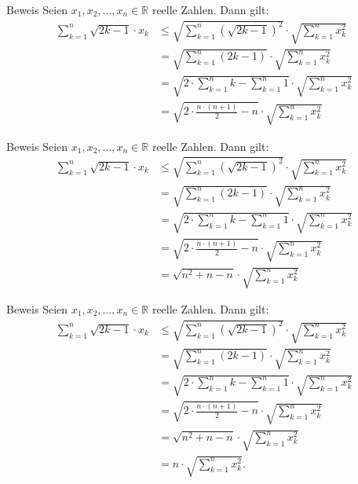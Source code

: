 \documentclass[10pt]{beamer}
\def\bR{\mathbb{R}}
\begin{document}
\begin{frame}{Beweis}
    Seien \( x_{1}, x_{2}, \ldots, x_{n} \in \bR \) reelle Zahlen. Dann gilt:
    \begin{align*}
        \sum_{k = 1}^{n} \sqrt{2k - 1} \cdot x_{k}
        & \leq \sqrt{\sum_{k = 1}^{n} \left( \sqrt{2k - 1} \right)^{2}} \cdot \sqrt{\sum_{k = 1}^{n} x_{k}^{2}} \\
        & = \sqrt{\sum_{k = 1}^{n} \left( 2k - 1 \right)} \cdot \sqrt{\sum_{k = 1}^{n} x_{k}^{2}} \\
        & = \sqrt{2 \cdot \sum_{k = 1}^{n} k - \sum_{k = 1}^{n} 1} \cdot \sqrt{\sum_{k = 1}^{n} x_{k}^{2}} \\
        & = \sqrt{2 \cdot \frac{n \cdot \left( n + 1 \right)}{2} - n} \cdot \sqrt{\sum_{k = 1}^{n} x_{k}^{2}}
    \end{align*}
\end{frame}



\begin{frame}{Beweis}
    Seien \( x_{1}, x_{2}, \ldots, x_{n} \in \bR \) reelle Zahlen. Dann gilt:
    \begin{align*}
        \sum_{k = 1}^{n} \sqrt{2k - 1} \cdot x_{k}
        & \leq \sqrt{\sum_{k = 1}^{n} \left( \sqrt{2k - 1} \right)^{2}} \cdot \sqrt{\sum_{k = 1}^{n} x_{k}^{2}} \\
        & = \sqrt{\sum_{k = 1}^{n} \left( 2k - 1 \right)} \cdot \sqrt{\sum_{k = 1}^{n} x_{k}^{2}} \\
        & = \sqrt{2 \cdot \sum_{k = 1}^{n} k - \sum_{k = 1}^{n} 1} \cdot \sqrt{\sum_{k = 1}^{n} x_{k}^{2}} \\
        & = \sqrt{2 \cdot \frac{n \cdot \left( n + 1 \right)}{2} - n} \cdot \sqrt{\sum_{k = 1}^{n} x_{k}^{2}} \\
        & = \sqrt{n^{2} + n - n} \cdot \sqrt{\sum_{k = 1}^{n} x_{k}^{2}}
    \end{align*}
\end{frame}



\begin{frame}{Beweis}
    Seien \( x_{1}, x_{2}, \ldots, x_{n} \in \bR \) reelle Zahlen. Dann gilt:
    \begin{align*}
        \sum_{k = 1}^{n} \sqrt{2k - 1} \cdot x_{k}
        & \leq \sqrt{\sum_{k = 1}^{n} \left( \sqrt{2k - 1} \right)^{2}} \cdot \sqrt{\sum_{k = 1}^{n} x_{k}^{2}} \\
        & = \sqrt{\sum_{k = 1}^{n} \left( 2k - 1 \right)} \cdot \sqrt{\sum_{k = 1}^{n} x_{k}^{2}} \\
        & = \sqrt{2 \cdot \sum_{k = 1}^{n} k - \sum_{k = 1}^{n} 1} \cdot \sqrt{\sum_{k = 1}^{n} x_{k}^{2}} \\
        & = \sqrt{2 \cdot \frac{n \cdot \left( n + 1 \right)}{2} - n} \cdot \sqrt{\sum_{k = 1}^{n} x_{k}^{2}} \\
        & = \sqrt{n^{2} + n - n} \cdot \sqrt{\sum_{k = 1}^{n} x_{k}^{2}} \\
        & = n \cdot \sqrt{\sum_{k = 1}^{n} x_{k}^{2}}.
    \end{align*}
\end{frame}
\end{document}
